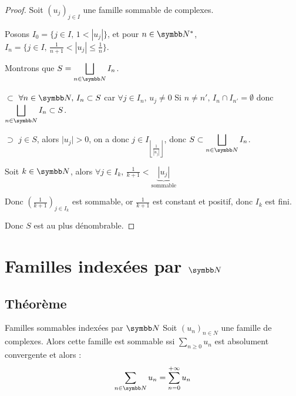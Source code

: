 \begin{proof}
    Soit $(u_j)_{j \in I}$ une famille sommable de complexes. 

    Posons $I_0 = \{j \in I, \, 1 < |u_j| \}$, et pour $n \in \N^*$,
    $I_n = \{j \in I, \, \frac 1 {n + 1} < |u_j| \leqslant \frac 1 n \}$.

    Montrons que $\displaystyle S = \bigsqcup_{n \in \N} I_n$. 

    $\subset$ $\forall n \in \N, \, I_n \subset S$ car $\forall j \in I_n, \, u_j \neq 0$
    Si $n \neq n', \, I_n \cap I_{n'} = \emptyset$ donc $\displaystyle \bigsqcup_{n \in \N} I_n \subset S$.

    $\supset$ $j \in S$, alors $\mid u_j \mid > 0$, on a donc $\displaystyle j \in I_{\left\lfloor \frac 1 {|u_j|} \right\rfloor}$, 
    donc $S \subset \displaystyle \bigsqcup_{n \in \N} I_n$.

    Soit $k \in \N$, alors $\forall j \in I_k, \, \frac 1 {k + 1} < \underbrace{|u_j|}_{\text{sommable}}$

    Donc $\left( \frac 1 {k + 1} \right)_{j \in I_k}$ est sommable, or $\frac 1 {k + 1}$ est constant et positif,
    donc $I_k$ est fini.

    Donc $S$ est au plus dénombrable.
\end{proof}

\section{Familles indexées par \texorpdfstring{$\N$}{N}}
\subsection{Théorème}

\begin{theoreme}{Familles sommables indexées par $\N$}{}
    Soit $(u_n)_{n \in N}$ une famille de complexes. Alors
    cette famille est sommable ssi $\displaystyle \sum_{n \geqslant 0} u_n$ est 
    absolument convergente et alors :
    \[\sum_{n \in \N} u_n = \sum_{n = 0}^{+\infty} u_n\]
\end{theoreme}

